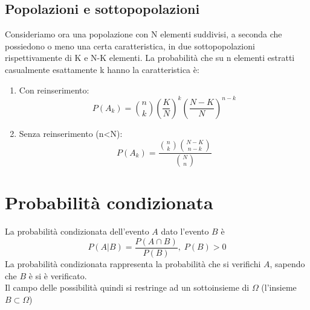 \documentclass{article}
\begin{document}
\subsection{Popolazioni e sottopopolazioni}
Consideriamo ora una popolazione con N elementi suddivisi, a seconda che possiedono o meno una certa caratteristica, in due sottopopolazioni rispettivamente di K e N-K elementi.
La probabilità che su n elementi estratti casualmente esattamente k hanno la caratteristica è:
\begin{enumerate}
\item Con reinserimento:
\begin{equation}
P(A_k) = {{n}\choose{k}}(\frac{K}{N})^{k}(\frac{N-K}{N})^{n-k}
\end{equation}
\item Senza reinserimento (n<N):
\begin{equation}
P(A_k) = \frac{{{n}\choose{k}}{{N-K}\choose{n-k}}}{{{N}\choose{n}}}
\end{equation}
\end{enumerate}
\newpage
\section{Probabilità condizionata}
La probabilità condizionata dell'evento $A$ dato l'evento $B$ è
\begin{equation}
P(A|B) = \frac{P({A}\cap{B})}{P(B)},\; P(B)>0
\end{equation}
La probabilità condizionata rappresenta la probabilità che si verifichi $A$, sapendo che $B$ è si è verificato.\\
Il campo delle possibilità quindi si restringe ad un sottoinsieme di $\Omega$ (l'insieme ${B}\subset{\Omega}$)
\end{document}
